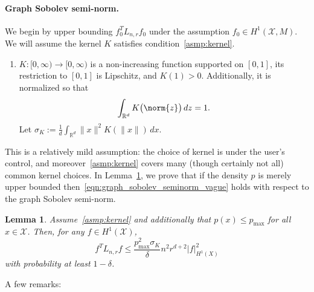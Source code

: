 \documentclass{article}
\newcommand{\Reals}{\mathbb{R}}
\newcommand{\1}{\mathbf{1}}
\newcommand{\Rd}{\Reals^d}
\newcommand{\Lap}{L}
\newcommand{\Xset}{\mathcal{X}}
\theoremstyle{alden}
\theoremstyle{aldenthm}
\newtheorem{lemma}{Lemma}
\theoremstyle{definition}
\theoremstyle{remark}
\begin{document}
\paragraph{Graph Sobolev semi-norm.}
We begin by upper bounding $f_0^T \Lap_{n,r} f_0$ under the assumption $f_0 \in H^1(\Xset,M)$. We will assume the kernel $K$ satisfies condition~\ref{asmp:kernel}.
\begin{enumerate}[label=(K\arabic*)]
	\item
	\label{asmp:kernel}
	$K:[0,\infty) \to [0,\infty)$ is a non-increasing function supported on $[0,1]$, its restriction to $[0,1]$ is Lipschitz, and $K(1) > 0$. Additionally, it is normalized so that
	\begin{equation*}
	\int_{\Reals^d} K\bigl(\norm{z}\bigr) \,dz = 1.
	\end{equation*}
	Let $\sigma_K := \frac{1}{d} \int_{\Rd} \|x\|^2 K(\|x\|) \,dx$.
\end{enumerate}
This is a relatively mild assumption: the choice of kernel is under the user's control, and moreover~\ref{asmp:kernel} covers many (though certainly not all) common kernel choices. In Lemma~\ref{lem:graph_sobolev_seminorm}, we prove that if the density $p$ is merely upper bounded then~\eqref{eqn:graph_sobolev_seminorm_vague} holds with respect to the graph Sobolev semi-norm.
\begin{lemma}
	\label{lem:graph_sobolev_seminorm}
	Assume~\ref{asmp:kernel} and additionally that $p(x) \leq p_{\max}$ for all $x \in \Xset$. Then, for any $f \in H^1(\Xset)$, 
	\begin{equation}
	\label{eqn:graph_sobolev_seminorm}
	f^T \Lap_{n,r} f \leq \frac{p_{\max}^2 \sigma_K}{\delta} n^2 r^{d + 2} |f|_{H^1(X)}^2
	\end{equation}
	with probability at least $1 - \delta$.
\end{lemma}
A few remarks:
\end{document}

